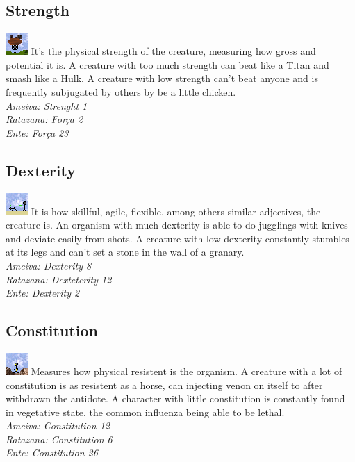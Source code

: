 \documentclass[ letterpaper,12pt]{article}
\begin{document}
\subsection{Strength}
\includegraphics{../data/skills/Img/forca.png}
It's the physical strength of the creature, measuring how gross and potential it is. A creature with too much strength can beat like a Titan and smash like a Hulk. A creature with low strength can't beat anyone and is frequently subjugated by others by be a little chicken.\\
{\it Ameiva: Strenght 1\\
Ratazana: Força 2\\
Ente: Força 23\\}

\subsection{Dexterity}
\includegraphics{../data/skills/Img/destreza.png}
It is how skillful, agile, flexible, among others similar adjectives, the creature is. An organism with much dexterity is able to do jugglings with knives and deviate easily from shots. A creature with low dexterity constantly stumbles at its legs and can't set a stone in the wall of a granary.\\
{\it Ameiva: Dexterity 8\\
Ratazana: Dexteterity 12\\
Ente: Dexterity 2}

\subsection{Constitution}
\includegraphics{../data/skills/Img/constituicao.png}
Measures how physical resistent is the organism. A creature with a lot of constitution is as resistent as a horse, can injecting venon on itself to after withdrawn the antidote. A character with little constitution is constantly found in vegetative state, the common influenza being able to be lethal.\\
{\it Ameiva: Constitution 12\\
Ratazana: Constitution 6\\
Ente: Constitution 26}
\end{document}
